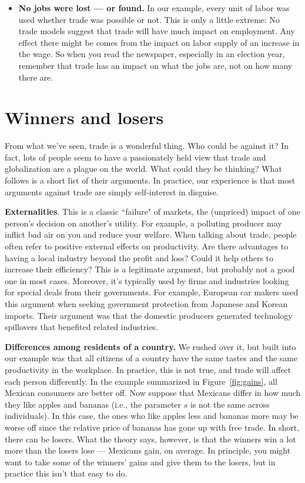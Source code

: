 \begin{itemize}
\item \textbf{No jobs were lost --- or found.}
In our example, every unit of labor was used whether trade was possible or not.
This is only a little extreme:  No trade models suggest that trade will have much
impact on employment.  Any effect there might be comes from the
impact on labor supply of an increase in the wage.
So when you read the newspaper, especially in an election year,
remember that trade has an impact on what the jobs are, not on how
many there are.
\end{itemize}

\section{Winners and losers}

From what we've seen, trade is a wonderful thing.  Who could
be against it?  In fact, lots of people seem to have a
passionately held view that trade and globalization are a
plague on the world.  What could they be thinking? What follows is
a short list of their arguments.
In practice, our experience is that most arguments against trade
are simply self-interest in disguise.


\textbf{Externalities}.  This is a classic ``failure" of markets,
the (unpriced) impact of one person's decision on another's
utility. For example, a polluting producer may inflict bad air on
you and reduce your welfare. When talking about trade, people
often refer to positive external effects on productivity.  Are
there advantages to having a local industry beyond the profit and
loss? Could it help others to increase their efficiency? This is a
legitimate argument, but probably not a good one in most cases.
Moreover, it's typically used by firms and industries looking for
special deals from their governments. For example,
European car makers used this argument when seeking government protection from
Japanese and Korean imports. Their argument was that the domestic
producers generated technology spillovers that benefited
related industries.

\textbf{Differences among residents of a country.} We rushed over
it, but built into our example was that all citizens of a
country have the same tastes and the same productivity in the
workplace. In practice, this is not true, and trade will affect
each person differently. In the example summarized in
Figure~\ref{fig:gains}, all Mexican consumers are better off. Now
suppose that Mexicans differ in how much they like apples and bananas
(i.e., the parameter $s$ is not the same across
individuals). In this case, the ones who like apples less and
bananas more may be worse off since the relative price of bananas
has gone up with free trade. In short, there can be losers. What
the theory says, however, is that the winners win a lot more than
the losers lose --- Mexicans gain, on average.
In principle, you might want to take some of the winners' gains and give them to the
losers, but in practice this isn't that easy to do.

